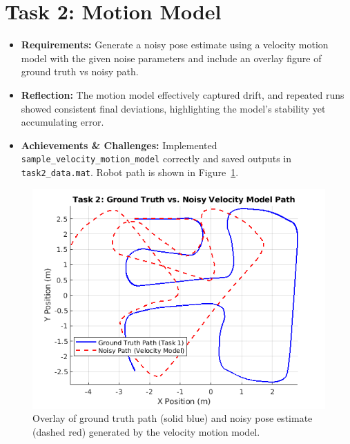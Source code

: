 \documentclass[conference]{IEEEtran}
\begin{document}
\section{Task 2: Motion Model}
\begin{itemize}
  \item \textbf{Requirements:} Generate a noisy pose estimate using a velocity motion model with the given noise parameters and include an overlay figure of ground truth vs noisy path.
  \item \textbf{Reflection:} The motion model effectively captured drift, and repeated runs showed consistent final deviations, highlighting the model's stability yet accumulating error.
  \item \textbf{Achievements \& Challenges:} Implemented \texttt{sample\_velocity\_motion\_model} correctly and saved outputs in \texttt{task2\_data.mat}. Robot path is shown in Figure~\ref{fig:task2_route}.
\end{itemize}
\begin{figure}[ht]
  \centering
  \includegraphics[width=\linewidth]{images/Task2_Route.png}
  \caption{Overlay of ground truth path (solid blue) and noisy pose estimate (dashed red) generated by the velocity motion model.}
  \label{fig:task2_route}
\end{figure}
\end{document}
